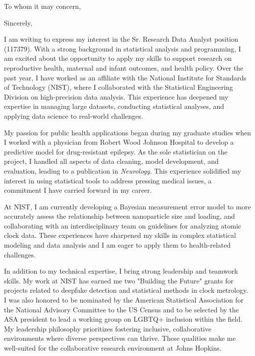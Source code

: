 \documentclass[11pt,a4paper,sans]{moderncv}
\begin{document}
	
	\date{\today }
	\opening{To whom it may concern,}
	\closing{Sincerely,}
	\makelettertitle

I am writing to express my interest in the Sr. Research Data Analyst position (117379). With a strong background in statistical analysis and programming, I am excited about the opportunity to apply my skills to support research on reproductive health, maternal and infant outcomes, and health policy. Over the past year, I have worked as an affiliate with the National Institute for Standards of Technology (NIST), where I collaborated with the Statistical Engineering Division on high-precision data analysis. This experience has deepened my expertise in managing large datasets, conducting statistical analyses, and applying data science to real-world challenges.

My passion for public health applications began during my graduate studies when I worked with a physician from Robert Wood Johnson Hospital to develop a predictive model for drug-resistant epilepsy. As the sole statistician on the project, I handled all aspects of data cleaning, model development, and evaluation, leading to a publication in \emph{Neurology}. This experience solidified my interest in using statistical tools to address pressing medical issues, a commitment I have carried forward in my career.

At NIST, I am currently developing a Bayesian measurement error model to more accurately assess the relationship between nanoparticle size and loading, and collaborating with an interdisciplinary team on guidelines for analyzing atomic clock data. These experiences have sharpened my skills in complex statistical modeling and data analysis and  I am eager to apply them to health-related challenges.

In addition to my technical expertise, I bring strong leadership and teamwork skills. My work at NIST has earned me two "Building the Future" grants for projects related to deepfake detection and statistical methods in clock metrology. I was also honored to be nominated by the American Statistical Association for the National Advisory Committee to the US Census and to be selected by the ASA president to lead a working group on LGBTQ+ inclusion within the field. My leadership philosophy prioritizes fostering inclusive, collaborative environments where diverse perspectives can thrive. These qualities make me well-suited for the collaborative research environment at Johns Hopkins.
\end{document}
